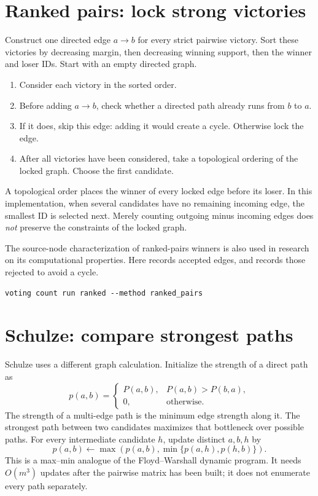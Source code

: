 \section{Ranked pairs: lock strong victories}
Construct one directed edge $a\to b$ for every strict pairwise victory. Sort these victories by decreasing margin, then decreasing winning support, then the winner and loser IDs. Start with an empty directed graph.
\begin{enumerate}
\item Consider each victory in the sorted order.
\item Before adding $a\to b$, check whether a directed path already runs from $b$ to $a$.
\item If it does, skip this edge: adding it would create a cycle. Otherwise lock the edge.
\item After all victories have been considered, take a topological ordering of the locked graph. Choose the first candidate.
\end{enumerate}
A topological order places the winner of every locked edge before its loser. In this implementation, when several candidates have no remaining incoming edge, the smallest ID is selected next. Merely counting outgoing minus incoming edges does \emph{not} preserve the constraints of the locked graph.

The source-node characterization of ranked-pairs winners is also used in research on its computational properties.\cite{rankedpairs} Here  records accepted edges, and  records those rejected to avoid a cycle.
\begin{lstlisting}[style=votingrun]
voting count run ranked --method ranked_pairs
\end{lstlisting}

\section{Schulze: compare strongest paths}
Schulze uses a different graph calculation. Initialize the strength of a direct path as
\[
p(a,b)=
\begin{cases}
P(a,b),&P(a,b)>P(b,a),\\
0,&\text{otherwise}.
\end{cases}
\]
The strength of a multi-edge path is the minimum edge strength along it. The strongest path between two candidates maximizes that bottleneck over possible paths. For every intermediate candidate $h$, update distinct $a,b,h$ by
\[
p(a,b)\leftarrow
\max\left(p(a,b),\min\{p(a,h),p(h,b)\}\right).
\]
This is a max--min analogue of the Floyd--Warshall dynamic program. It needs $O(m^3)$ updates after the pairwise matrix has been built; it does not enumerate every path separately.

